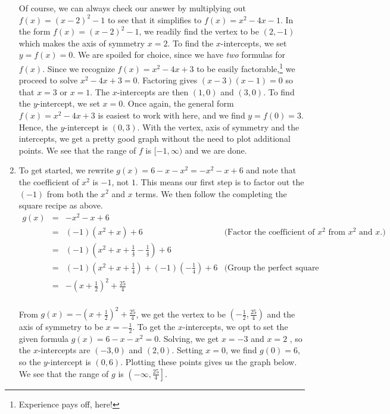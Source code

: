 \begin{ex}
\begin{enumerate}
\smallskip

Of course, we can always check our answer by multiplying out $f(x) = (x-2)^2 -1$ to see that it simplifies to $f(x) = x^2 - 4x - 1$. In the form $f(x) = (x-2)^2-1$, we readily find the vertex to be $(2,-1)$ which makes the axis of symmetry $x = 2$.  To find the $x$-intercepts, we set $y = f(x) = 0$.  We are spoiled for choice, since we have \textit{two} formulas for $f(x)$.  Since we recognize $f(x) = x^2-4x+3$ to be easily factorable,\footnote{Experience pays off, here!} we proceed to solve $x^2-4x+3 = 0$.  Factoring gives $(x-3)(x-1) = 0$ so that $x = 3$ or $x=1$.  The $x$-intercepts are then $(1,0)$ and $(3,0)$.  To find the $y$-intercept, we set $x=0$.  Once again, the general form $f(x) = x^2-4x+3$ is easiest to work with here,  and we find $y = f(0) = 3$.  Hence, the $y$-intercept is $(0,3)$.  With the vertex, axis of symmetry and the intercepts, we get a pretty good graph without the need to plot additional points.  We see that the range of $f$ is $[-1,\infty)$ and we are done.

\item  To get started, we rewrite $g(x) = 6-x-x^2 = -x^2-x+6$ and note that the coefficient of $x^2$ is $-1$, not $1$.  This means our first step is to factor out the $(-1)$ from both the $x^2$ and $x$ terms.  We then follow the completing the square recipe as above. \[ \begin{array}{rclr}

g(x) & = & -x^2-x+6 &  \\
	   & = & (-1)\left(x^2 + x \right) + 6 & \text{(Factor the coefficient of $x^2$ from $x^2$ and $x$.)} \\ [5pt]
		 & = & (-1)\left(x^2 + x + \underline{\frac{1}{4}} - \underline{\frac{1}{4}} \right) + 6 & \\ [5pt]
		 & = & (-1)\left(x^2 + x + \frac{1}{4}\right) + (-1)\left(-\frac{1}{4}\right) + 6 & \text{(Group the perfect square trinomial.)}\\ [5pt]
		  & = & -\left(x +\frac{1}{2}\right)^2 + \frac{25}{4} & \\
		 \end{array} \]
	
\pagebreak

From $g(x) =  -\left(x +\frac{1}{2}\right)^2 + \frac{25}{4}$, we get the vertex to be $\left(-\frac{1}{2}, \frac{25}{4}\right)$ and the axis of symmetry to be $x = -\frac{1}{2}$.  To get the $x$-intercepts, we opt to set the given formula $g(x) = 6-x-x^2 = 0$.  Solving, we get $x = -3$ and $x=2$ , so the $x$-intercepts are $(-3,0)$ and $(2,0)$.  Setting $x=0$, we find $g(0) = 6$, so the $y$-intercept is $(0,6)$. Plotting these points gives us the graph below.  We see that the range of $g$ is $\left(-\infty, \frac{25}{4}\right]$.


\end{enumerate}
\end{ex}
